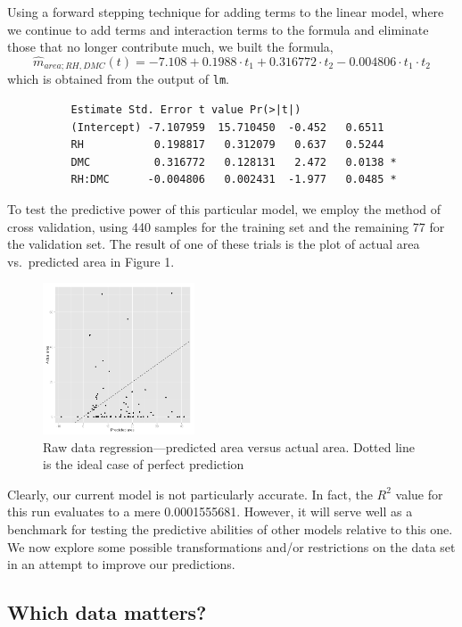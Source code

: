 \documentclass{article}
\begin{document}
Using a forward stepping technique for adding terms to the linear model, where
we continue to add terms and interaction terms to the formula and eliminate
those that no longer contribute much, we built the formula,
\begin{equation}
  \widehat{m}_{area;RH,DMC}(t) = -7.108 + 0.1988 \cdot t_1 + 0.316772 \cdot t_2
  - 0.004806 \cdot t_1 \cdot t_2
\end{equation}
which is obtained from the output of \verb=lm=.

\begin{verbatim}
          Estimate Std. Error t value Pr(>|t|)  
          (Intercept) -7.107959  15.710450  -0.452   0.6511  
          RH           0.198817   0.312079   0.637   0.5244  
          DMC          0.316772   0.128131   2.472   0.0138 *
          RH:DMC      -0.004806   0.002431  -1.977   0.0485 *
\end{verbatim}

To test the predictive power of this particular model, we employ the method of
cross validation, using 440 samples for the training set and the remaining 77
for the validation set. The result of one of these trials is the plot of actual
area vs.\ predicted area in Figure 1.

\begin{figure}
  \centering
  \includegraphics[width=0.4\textwidth]{figures/firenaivepredict.png}
  \caption{Raw data regression---predicted area versus actual area. Dotted line
  is the ideal case of perfect prediction}
\end{figure}

Clearly, our current model is not particularly accurate. In fact, the $R^2$
value for this run evaluates to a mere 0.0001555681. However, it will serve
well as a benchmark for testing the predictive abilities of other models
relative to this one. We now explore some possible transformations and/or
restrictions on the data set in an attempt to improve our predictions.

\subsection{Which data matters?}
\end{document}
